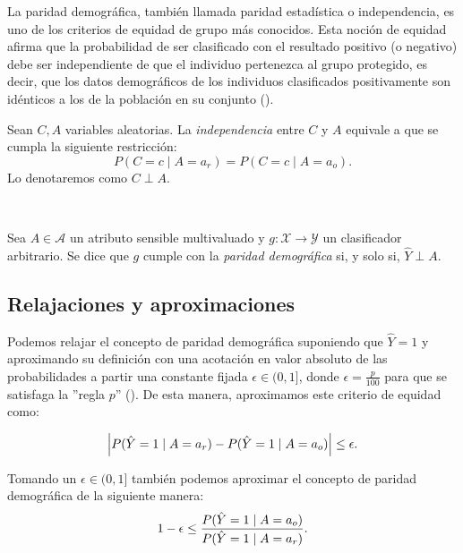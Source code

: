 \documentclass[oneside,openright,titlepage,numbers=noenddot,openany,headinclude,footinclude=true,
cleardoublepage=empty,abstractoff,BCOR=5mm,paper=a4,fontsize=12pt,main=spanish]{scrreprt}
\begin{document}
La paridad demográfica, también llamada paridad estadística o independencia, es uno de los criterios de equidad de grupo más conocidos. Esta noción de equidad afirma que la probabilidad de ser clasificado con el resultado positivo (o negativo) debe ser independiente de que el individuo pertenezca al grupo protegido, es decir, que los datos demográficos de los individuos clasificados positivamente son idénticos a los de la población en su conjunto (\cite{detect2012}).\\

\begin{definition}
Sean $C,A$ variables aleatorias. La \textit{independencia} entre $C$ y $A$ equivale a que se cumpla la siguiente restricción:
$$P(C=c \mid A=a_r)=P(C=c \mid A=a_o).$$
Lo denotaremos como $C \perp A.$
\end{definition}\

\begin{definition} \label{def:pardemo}
Sea $A \in \mathcal{A}$ un atributo sensible multivaluado y $g\colon \mathcal{X} \to \mathcal{Y}$ un clasificador arbitrario. Se dice que $g$ cumple con la \textit{paridad demográfica} si, y solo si, $\hat{Y} \perp A.$
\end{definition}

\subsection*{Relajaciones y aproximaciones}

Podemos relajar el concepto de paridad demográfica suponiendo que $\hat{Y}=1$ y aproximando su definición con una acotación en valor absoluto de las probabilidades a partir una constante fijada $\epsilon \in (0,1]$, donde $\epsilon=\frac{p}{100}$ para que se satisfaga la ''regla $p$'' (\cite{constraints2017}). De esta manera, aproximamos este criterio de equidad como: 

\begin{equation*}
\left\lvert P(\hat{Y}=1 \mid A=a_r)-P(\hat{Y}=1 \mid A=a_o)\right\rvert \leq \epsilon.
\end{equation*}

Tomando un $\epsilon \in (0,1]$ también podemos aproximar el concepto de paridad demográfica de la siguiente manera:
\begin{equation}\label{eq:p}
   1-\epsilon \leq \frac{\displaystyle P(\hat{Y}=1 \mid A=a_o)}{\displaystyle P(\hat{Y}=1 \mid A=a_r)}. 
\end{equation}
\end{document}

